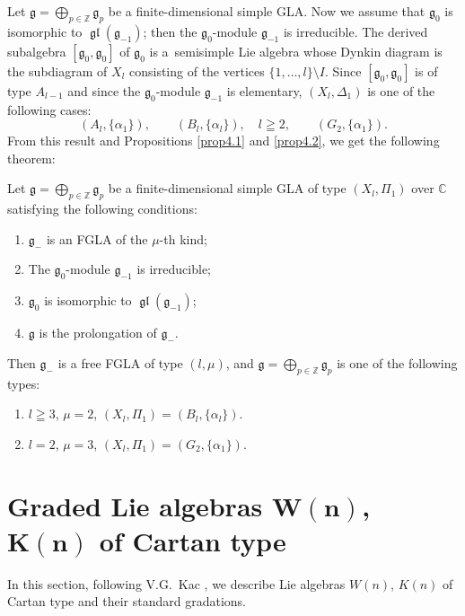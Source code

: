 \documentclass[pdftex]{sigma}
\numberwithin{equation}{section}
\numberwithin{theorem}{section}
\numberwithin{proposition}{section}
\numberwithin{lemma}{section}
\numberwithin{corollary}{section}
\numberwithin{definition}{section}
\numberwithin{example}{section}
\numberwithin{remark}{section}
\numberwithin{note}{section}
\newcommand{\gl}{\operatorname{\mathfrak{gl}}}
\newcommand{\gla}[1]{\mathfrak#1=\bigoplus\limits_{p\in\mathbb Z}\mathfrak#1_p} \renewcommand{\labelenumi}{{\rm (\arabic{enumi})}}
\begin{document}
Let $\gla g$ be a f\/inite-dimensional simple GLA.
Now we assume that $\mathfrak g_0$ is isomorphic to $\gl(\mathfrak g_{-1})$;
then the $\mathfrak g_0$-module $\mathfrak g_{-1}$ is irreducible.
The derived subalgebra $[\mathfrak g_0,\mathfrak g_0]$ of $\mathfrak g_0$
is a~semisimple Lie algebra whose Dynkin diagram is the subdiagram of
$X_l$ consisting
of the vertices $\{1,\dots,l\}\setminus I$.
Since $[\mathfrak g_0,\mathfrak g_0]$ is of type $A_{l-1}$ and since
the $\mathfrak g_0$-module $\mathfrak g_{-1}$ is elementary,
$(X_l,\Delta_1)$ is one of the following cases:
\[
(A_l,\{\alpha_1\}),\qquad (B_l,\{\alpha_l\}), \quad  l\geqq2,
\qquad (G_2,\{\alpha_1\}).
\]
From this result and Propositions \ref{prop4.1} and \ref{prop4.2}, we get the following theorem:
\begin{theorem}\label{thm5.2}
Let $\gla g$ be a finite-dimensional simple GLA of type
$(X_l,\Pi_1)$ over $\mathbb C$ satisfying the following conditions:
\begin{enumerate}\itemsep=0pt
\renewcommand{\labelenumi}{$(\roman{enumi})$}
\item $\mathfrak g_-$ is an FGLA of the $\mu$-th kind;
\item The $\mathfrak g_0$-module $\mathfrak g_{-1}$ is irreducible;
\item $\mathfrak g_0$ is isomorphic to $\gl(\mathfrak g_{-1})$;
\item $\mathfrak g$ is the prolongation of $\mathfrak g_{-}$.
\end{enumerate}

Then $\mathfrak g_-$ is a free FGLA of type
$(l,\mu)$, and
$\gla g$ is one of the following types:
\begin{enumerate}\itemsep=0pt
\renewcommand{\labelenumi}{$(\alph{enumi})$}
\item $l\geqq3$, $\mu=2$, $(X_l,\Pi_1)=(B_l,\{\alpha_l\})$.
\item $l=2$, $\mu=3$, $(X_l,\Pi_1)=(G_2,\{\alpha_1\})$.
\end{enumerate}
\end{theorem}

\section[Graded Lie algebras $W(n)$, $K(n)$ of Cartan type]{Graded Lie algebras $\boldsymbol{W(n)}$, $\boldsymbol{K(n)}$ of Cartan type}\label{section6}

In this section, following V.G.~Kac \cite{kac68:1},
we describe Lie algebras $W(n)$, $K(n)$ of Cartan type and their standard gradations.
\end{document}
